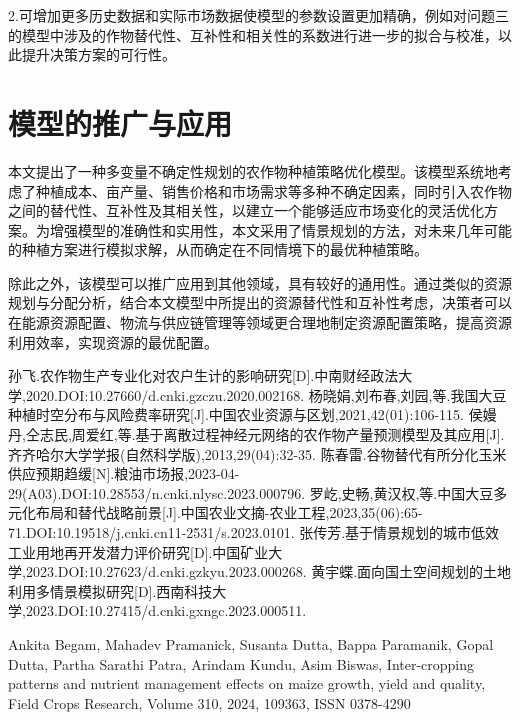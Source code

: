 \documentclass{cumcmthesis}
\begin{document}
2.可增加更多历史数据和实际市场数据使模型的参数设置更加精确，例如对问题三的模型中涉及的作物替代性、互补性和相关性的系数进行进一步的拟合与校准，以此提升决策方案的可行性。

\section{模型的推广与应用}
本文提出了一种多变量不确定性规划的农作物种植策略优化模型。该模型系统地考虑了种植成本、亩产量、销售价格和市场需求等多种不确定因素，同时引入农作物之间的替代性、互补性及其相关性，以建立一个能够适应市场变化的灵活优化方案。为增强模型的准确性和实用性，本文采用了情景规划的方法，对未来几年可能的种植方案进行模拟求解，从而确定在不同情境下的最优种植策略。

除此之外，该模型可以推广应用到其他领域，具有较好的通用性。通过类似的资源规划与分配分析，结合本文模型中所提出的资源替代性和互补性考虑，决策者可以在能源资源配置、物流与供应链管理等领域更合理地制定资源配置策略，提高资源利用效率，实现资源的最优配置。

\begin{thebibliography}{99}  
 孙飞.农作物生产专业化对农户生计的影响研究[D].中南财经政法大学,2020.DOI:10.27660/d.cnki.gzczu.2020.002168.
 杨晓娟,刘布春,刘园,等.我国大豆种植时空分布与风险费率研究[J].中国农业资源与区划,2021,42(01):106-115.
 侯嫚丹,仝志民,周爱红,等.基于离散过程神经元网络的农作物产量预测模型及其应用[J].齐齐哈尔大学学报(自然科学版),2013,29(04):32-35.
 陈春雷.谷物替代有所分化玉米供应预期趋缓[N].粮油市场报,2023-04-29(A03).DOI:10.28553/n.cnki.nlysc.2023.000796.
 罗屹,史畅,黄汉权,等.中国大豆多元化布局和替代战略前景[J].中国农业文摘-农业工程,2023,35(06):65-71.DOI:10.19518/j.cnki.cn11-2531/s.2023.0101.
 张传芳.基于情景规划的城市低效工业用地再开发潜力评价研究[D].中国矿业大学,2023.DOI:10.27623/d.cnki.gzkyu.2023.000268.
 黄宇蝶.面向国土空间规划的土地利用多情景模拟研究[D].西南科技大学,2023.DOI:10.27415/d.cnki.gxngc.2023.000511.


 Ankita Begam, Mahadev Pramanick, Susanta Dutta, Bappa Paramanik, Gopal Dutta, Partha Sarathi Patra, Arindam Kundu, Asim Biswas, Inter-cropping patterns and nutrient management effects on maize growth, yield and quality,
Field Crops Research, Volume 310, 2024, 109363, ISSN 0378-4290



\end{thebibliography}
    
\end{document}
